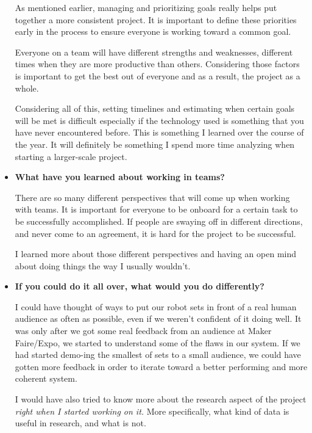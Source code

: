 \begin{itemize}
    As mentioned earlier, managing and prioritizing goals really helps put together a more consistent project. It is important to define
    these priorities early in the process to ensure everyone is working toward a common goal.

    Everyone on a team will have different strengths and weaknesses, different times when they are more productive than others.
    Considering those factors is important to get the best out of everyone and as a result, the project as a whole.

    Considering all of this, setting timelines and estimating when certain goals will be met is difficult especially if the technology
    used is something that you have never encountered before. This is something I learned over the course of the year.
    It will definitely be something I spend more time analyzing when starting a larger-scale project.


\item{\textbf{What have you learned about working in teams?}}

    There are so many different perspectives that will come up when working with teams. It is important for everyone to be
    onboard for a certain task to be successfully accomplished. If people are swaying off in different directions,
    and never come to an agreement, it is hard for the project to be successful.

    I learned more about those different perspectives and having an open mind about doing things the way I usually wouldn't.


\item{\textbf{If you could do it all over, what would you do differently?}}

    I could have thought of ways to put our robot sets in front of a real human audience as often as possible, even if we weren't confident
    of it doing well. It was only after we got some real feedback from an audience at Maker Faire/Expo, we started to understand some of the flaws
    in our system. If we had started demo-ing the smallest of sets to a small audience, we could have gotten more feedback in order to
    iterate toward a better performing and more coherent system.

    I would have also tried to know more about the research aspect of the project \textit{right when I started working on it.} More specifically,
    what kind of data is useful in research, and what is not.

\end{itemize}
\clearpage


